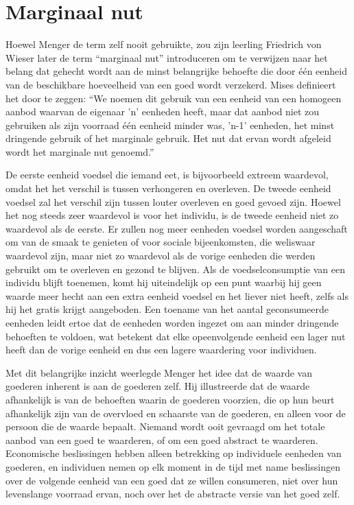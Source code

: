 \section{Marginaal nut}

Hoewel Menger de term zelf nooit gebruikte, zou zijn leerling Friedrich von Wieser later de term “marginaal nut” introduceren om te verwijzen naar het belang dat gehecht wordt aan de minst belangrijke behoefte die door één eenheid van de beschikbare hoeveelheid van een goed wordt verzekerd. Mises definieert het door te zeggen: “We noemen dit gebruik van een eenheid van een homogeen aanbod waarvan de eigenaar 'n' eenheden heeft, maar dat aanbod niet zou gebruiken als zijn voorraad één eenheid minder was, 'n-1' eenheden, het minst dringende gebruik of het marginale gebruik. Het nut dat ervan wordt afgeleid wordt het marginale nut genoemd.”\autocite{21}

De eerste eenheid voedsel die iemand eet, is bijvoorbeeld extreem waardevol, omdat het het verschil is tussen verhongeren en overleven. De tweede eenheid voedsel zal het verschil zijn tussen louter overleven en goed gevoed zijn. Hoewel het nog steeds zeer waardevol is voor het individu, is de tweede eenheid niet zo waardevol als de eerste. Er zullen nog meer eenheden voedsel worden aangeschaft om van de smaak te genieten of voor sociale bijeenkomsten, die weliswaar waardevol zijn, maar niet zo waardevol als de vorige eenheden die werden gebruikt om te overleven en gezond te blijven. Als de voedselconsumptie van een individu blijft toenemen, komt hij uiteindelijk op een punt waarbij hij geen waarde meer hecht aan een extra eenheid voedsel en het liever niet heeft, zelfs als hij het gratis krijgt aangeboden. Een toename van het aantal geconsumeerde eenheden leidt ertoe dat de eenheden worden ingezet om aan minder dringende behoeften te voldoen, wat betekent dat elke opeenvolgende eenheid een lager nut heeft dan de vorige eenheid en dus een lagere waardering voor individuen. 

Met dit belangrijke inzicht weerlegde Menger het idee dat de waarde van goederen inherent is aan de goederen zelf. Hij illustreerde dat de waarde afhankelijk is van de behoeften waarin de goederen voorzien, die op hun beurt afhankelijk zijn van de overvloed en schaarste van de goederen, en alleen voor de persoon die de waarde bepaalt. Niemand wordt ooit gevraagd om het totale aanbod van een goed te waarderen, of om een goed abstract te waarderen. Economische beslissingen hebben alleen betrekking op individuele eenheden van goederen, en individuen nemen op elk moment in de tijd met name beslissingen over de volgende eenheid van een goed dat ze willen consumeren, niet over hun levenslange voorraad ervan, noch over het de abstracte versie van het goed zelf.


